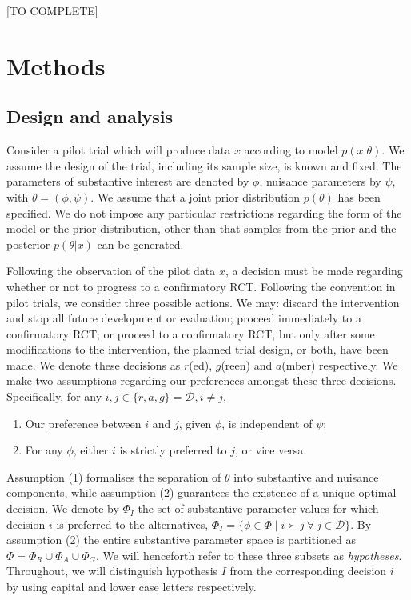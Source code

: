 \documentclass{article} %
\begin{document}
[TO COMPLETE]

\section{Methods}\label{sec:methods}

\subsection{Design and analysis}\label{sec:specification}

Consider a pilot trial which will produce data $x$ according to model $p(x | \theta)$. We assume the design of the trial, including its sample size, is known and fixed. The parameters of substantive interest are denoted by $\phi$, nuisance parameters by $\psi$, with $\theta = (\phi, \psi)$. We assume that a joint prior distribution $p(\theta)$ has been specified. We do not impose any particular restrictions regarding the form of the model or the prior distribution, other than that samples from the prior and the posterior $p(\theta | x)$ can be generated.

Following the observation of the pilot data $x$, a decision must be made regarding whether or not to progress to a confirmatory RCT. Following the convention in pilot trials, we consider three possible actions. We may: discard the intervention and stop all future development or evaluation; proceed immediately to a confirmatory RCT; or proceed to a confirmatory RCT, but only after some modifications to the intervention, the planned trial design, or both, have been made. We denote these decisions as $r$(ed), $g$(reen) and $a$(mber) respectively. We make two assumptions regarding our preferences amongst these three decisions. Specifically, for any $i, j \in \{r, a, g\} = \mathcal{D}, i \neq j,$
\begin{enumerate}
\item Our preference between $i$ and $j$, given $\phi$, is independent of $\psi$;
\item For any $\phi$, either $i$ is strictly preferred to $j$, or vice versa.
\end{enumerate}
Assumption (1) formalises the separation of $\theta$ into substantive and nuisance components, while assumption (2) guarantees the existence of a unique optimal decision. We denote by $\Phi_{I}$ the set of substantive parameter values for which decision $i$ is preferred to the alternatives, $\Phi_{I} = \{ \phi \in \Phi \mid i \succ j ~\forall ~j \in \mathcal{D} \}$. By assumption (2) the entire substantive parameter space is partitioned as $\Phi = \Phi_{R} \cup \Phi_{A} \cup \Phi_{G}$. We will henceforth refer to these three subsets as \emph{hypotheses}. Throughout, we will distinguish hypothesis $I$ from the corresponding decision $i$ by using capital and lower case letters respectively.
\end{document}
